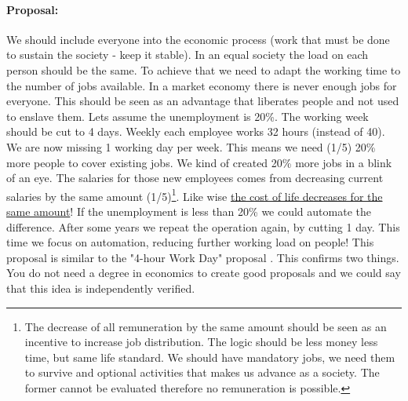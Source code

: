 \documentclass{article}
\begin{document}
\paragraph{Proposal:}
We should include everyone into the economic process (work that must be done to sustain the society - keep it stable).
In an equal society the load on each person should be the same.
To achieve that we need to adapt the working time to the number of jobs available.
In a market economy there is never enough jobs for everyone.
This should be seen as an advantage that liberates people and not used to enslave them.
Lets assume the unemployment is 20\%.
The working week should be cut to 4 days.
Weekly each employee works 32 hours (instead of 40).
We are now missing 1 working day per week.
This means we need (1/5) 20\% more people to cover existing jobs.
We kind of created 20\% more jobs in a blink of an eye.
The salaries for those new employees comes from decreasing current salaries by the same amount (1/5)\footnote{The decrease of all remuneration by the same amount should be seen as an incentive to increase job distribution. The logic should be less money less time, but same life standard. We should have mandatory jobs, we need them to survive and optional activities that makes us advance as a society. The former cannot be evaluated therefore no remuneration is possible.}.
Like wise \underline{the cost of life decreases for the same amount}!
If the unemployment is less than 20\% we could automate the difference.
After some years we repeat the operation again, by cutting 1 day.
This time we focus on automation, reducing further working load on people!
This proposal is similar to the "4-hour Work Day" proposal \cite{4hourday}.
This confirms two things.
You do not need a degree in economics to create good proposals and we could say that this idea is independently verified.
\end{document}
